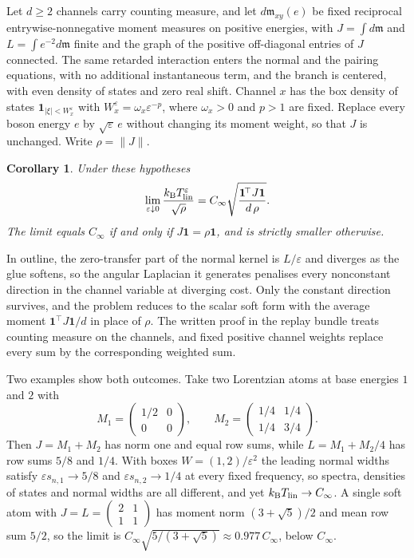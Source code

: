 \documentclass[10pt]{article}
\newtheorem{corollary}[theorem]{Corollary}
\theoremstyle{remark}
\newcommand{\kB}{k_{\mathrm B}}
\newcommand{\Cinf}{C_\infty}
\begin{document}
Let $d\ge2$ channels carry counting measure, and let $d\mathfrak m_{xy}(e)$ be fixed reciprocal entrywise-nonnegative moment measures on positive energies, with $J=\int d\mathfrak m$ and $L=\int e^{-2}d\mathfrak m$ finite and the graph of the positive off-diagonal entries of $J$ connected. The same retarded interaction enters the normal and the pairing equations, with no additional instantaneous term, and the branch is centered, with even density of states and zero real shift. Channel $x$ has the box density of states $\mathbf 1_{|\xi|<W_x^\varepsilon}$ with $W_x^\varepsilon=\omega_x\varepsilon^{-p}$, where $\omega_x>0$ and $p>1$ are fixed. Replace every boson energy $e$ by $\sqrt\varepsilon\,e$ without changing its moment weight, so that $J$ is unchanged. Write $\rho=\|J\|$.

\begin{corollary}\label{cor:soft}
Under these hypotheses
\[
\lim_{\varepsilon\downarrow0}\frac{\kB T_{\rm lin}^{\varepsilon}}{\sqrt\rho}=\Cinf\sqrt{\frac{\mathbf 1^{\!\top}J\mathbf 1}{d\,\rho}} .
\]
The limit equals $\Cinf$ if and only if $J\mathbf 1=\rho\mathbf 1$, and is strictly smaller otherwise.
\end{corollary}

In outline, the zero-transfer part of the normal kernel is $L/\varepsilon$ and diverges as the glue softens, so the angular Laplacian it generates penalises every nonconstant direction in the channel variable at diverging cost. Only the constant direction survives, and the problem reduces to the scalar soft form with the average moment $\mathbf 1^{\!\top}J\mathbf 1/d$ in place of $\rho$. The written proof in the replay bundle treats counting measure on the channels, and fixed positive channel weights replace every sum by the corresponding weighted sum.

Two examples show both outcomes. Take two Lorentzian atoms at base energies $1$ and $2$ with
\[
M_1=\begin{pmatrix}1/2&0\\0&0\end{pmatrix},\qquad M_2=\begin{pmatrix}1/4&1/4\\1/4&3/4\end{pmatrix}.
\]
Then $J=M_1+M_2$ has norm one and equal row sums, while $L=M_1+M_2/4$ has row sums $5/8$ and $1/4$. With boxes $W=(1,2)/\varepsilon^2$ the leading normal widths satisfy $\varepsilon s_{n,1}\to5/8$ and $\varepsilon s_{n,2}\to1/4$ at every fixed frequency, so spectra, densities of states and normal widths are all different, and yet $\kB T_{\rm lin}\to\Cinf$. A single soft atom with $J=L=\begin{pmatrix}2&1\\1&1\end{pmatrix}$ has moment norm $(3+\sqrt5)/2$ and mean row sum $5/2$, so the limit is $\Cinf\sqrt{5/(3+\sqrt5)}\approx0.977\,\Cinf$, below $\Cinf$.
\end{document}
